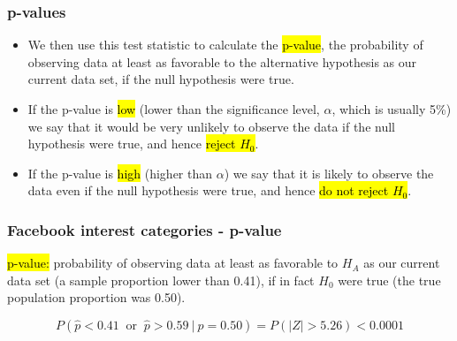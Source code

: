 \documentclass[t,compress,mathserif]{beamer}
\begin{document}
\begin{frame}
\frametitle{p-values}

\begin{itemize}

\item We then use this test statistic to calculate the \hl{p-value}, the probability of observing data at least as favorable to the alternative hypothesis as our current data set, if the null hypothesis were true.

\pause

\item If the p-value is \hl{low} (lower than the significance level, $\alpha$, which is usually 5\%) we say that it would be very unlikely to observe the data if the null hypothesis were true, and hence \hl{reject $H_0$}.

\pause

\item If the p-value is \hl{high} (higher than $\alpha$) we say that it is likely to observe the data even if the null hypothesis were true, and hence \hl{do not reject $H_0$}.

\end{itemize}

\end{frame}


\begin{frame}
\frametitle{Facebook interest categories - p-value}

\hl{p-value:} probability of observing data at least as favorable to $H_A$ as our current data set (a sample proportion lower than 0.41), if in fact $H_0$ were true (the true population proportion was 0.50).

\pause

\[ P(\hat{p} < 0.41~\text{ or }~\hat{p} > 0.59~|~p = 0.50) = P(|Z| > 5.26) < 0.0001 \]

\end{frame}

\end{document}
